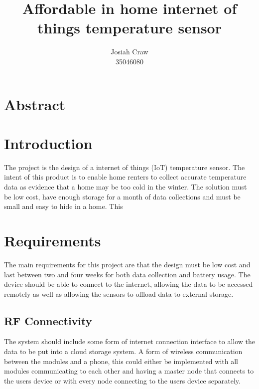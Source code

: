\documentclass{article}
\author{Josiah Craw\\35046080}
\title{\huge{Affordable in home internet of things temperature sensor}}
\begin{document}
\maketitle

\newpage

\section*{Abstract}

\newpage

\tableofcontents

\newpage

\section{Introduction}
The project is the design of a internet of things (IoT) temperature sensor. The intent of this
product is to enable home renters to collect accurate temperature data as evidence that a home may
be too cold in the winter. The solution must be low cost, have enough storage for a month of data
collections and must be small and easy to hide in a home. This 

\section{Requirements}
The main requirements for this project are that the design must be low cost and last between two
and four weeks for both data collection and battery usage. The device should be able to connect to
the internet, allowing the data to be accessed remotely as well as allowing the sensors to offload
data to external storage.

\subsection{RF Connectivity}
The system should include some form of internet connection interface to allow the data to be put 
into a cloud storage system. A form of wireless communication between the modules and a phone,
this could either be implemented with all modules communicating to each other and having a master
node that connects to the users device or with every node connecting to the users device
separately. 
\end{document}

